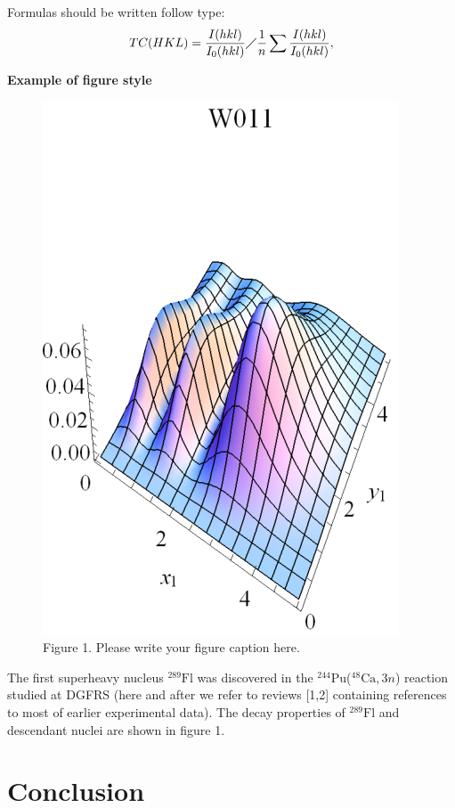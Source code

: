 \documentclass[12pt,a4paper,twoside]{article}
\begin{document}
Formulas should be written follow type:
\begin{equation}
TC(HKL)= \frac{I(hkl)}{I_0(hkl)}\diagup\frac{1}{n}\sum{\frac{I(hkl)}{I_0(hkl)}},\label{}
\end{equation}

\begin{flushleft}
\textbf{Example of figure style}
\end{flushleft}

\begin{figure}[h!]
\centering
\includegraphics[scale=0.8]{W1_1.eps}\\
\scriptsize{ Figure 1. Please write your figure caption here.}
\label{fig:image1}
\end{figure}

The first superheavy nucleus $^{289}\text{Fl}$ was discovered in the $^{244}$Pu($^{48}\text{Ca},3n$) reaction studied at DGFRS (here and after we refer to reviews [1,2] containing references to most of earlier experimental data). The decay properties of $^{289}\text{Fl}$ and descendant nuclei are shown in figure 1.


\section*{Conclusion}
\end{document}
